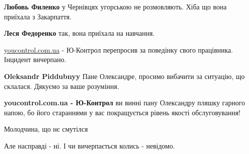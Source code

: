 \begin{itemize}
\begin{itemize}
\textbf{Любовь Филенко} у Чернівцях угорською не розмовляють. Хіба що вона приїхала з Закарпаття.

 
\textbf{Леся Федоренко} так, вона приїхала на навчання.
\end{itemize}

 
\url{youcontrol.com.ua} - Ю-Контрол перепросив за поведінку свого працівника. Інцидент вичерпано.

\begin{itemize}
 
\textbf{Oleksandr Piddubnyy} Пане Олександре, просимо вибачити за ситуацію, що склалася. Дякуємо за ваше розуміння.

 
\textbf{youcontrol.com.ua - Ю-Контрол} ви винні пану Олександру пляшку гарного
напою, бо його стараннями у вас покращується рівень якості обслуговування!
\end{itemize}

 
Молодчина, що нє смутілся

 
Але насправді - ні. І чи вичерпається колись - невідомо.

\end{itemize}

